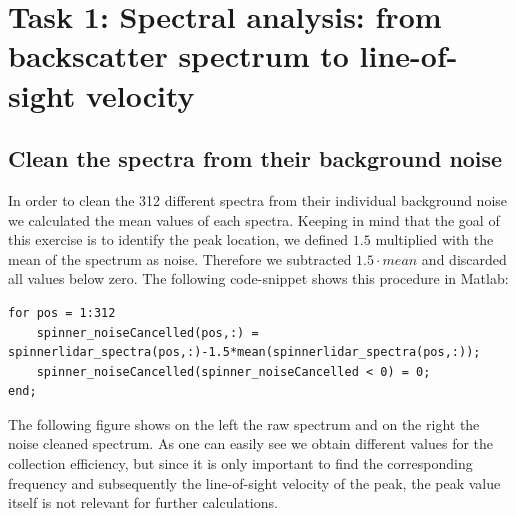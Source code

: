 \documentclass[10pt]{article}
\begin{document}
\section{Task 1: Spectral analysis: from backscatter spectrum to line-of-sight velocity}
\subsection{Clean the spectra from their background noise}
In order to clean the 312 different spectra from their individual background noise we calculated the mean values of each spectra. Keeping in mind that the goal of this exercise is to identify the peak location, we defined $1.5$ multiplied with the mean of the spectrum as noise. Therefore we subtracted $1.5 \cdot mean$ and discarded all values below zero. The following code-snippet shows this procedure in Matlab:\\

\begin{lstlisting}
for pos = 1:312
    spinner_noiseCancelled(pos,:) = spinnerlidar_spectra(pos,:)-1.5*mean(spinnerlidar_spectra(pos,:));
    spinner_noiseCancelled(spinner_noiseCancelled < 0) = 0;
end;
\end{lstlisting}
The following figure shows on the left the raw spectrum and on the right the noise cleaned spectrum. As one can easily see we obtain different values for the collection efficiency, but since it is only important to find the corresponding frequency and subsequently the line-of-sight velocity of the peak, the peak value itself is not relevant for further calculations.
\end{document}
